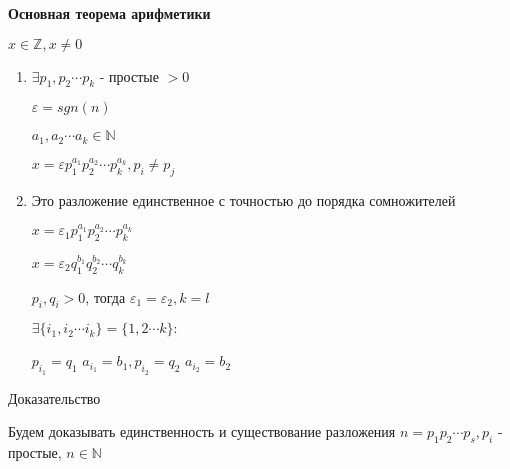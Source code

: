 \documentclass[14pt, letter paper]{article}
\begin{document}
\textbf{Основная теорема арифметики}

$x \in \mathds{Z}, x \neq 0$

\begin{enumerate}
    \item $\exists p_1, p_2 \cdots p_k$ - простые $> 0$

    $\varepsilon = sgn(n)$

    $a_1, a_2 \cdots a_k \in \mathds{N}$

    $x = \varepsilon p_1^{a_1} p_2^{a_2} \cdots p_k^{a_k}, p_i \neq p_j$

    \item Это разложение единственное с точностью до порядка сомножителей

    $x = \varepsilon_1 p_1^{a_1} p_2^{a_2} \cdots p_k^{a_k}$

    $x = \varepsilon_2 q_1^{b_1} q_2^{b_2} \cdots q_k^{b_k}$

    $p_i, q_i > 0$, тогда $\varepsilon_1 = \varepsilon_2, k = l$

    $\exists \{i_1, i_2 \cdots i_k\} = \{1, 2 \cdots k\}:$

    $p_{i_1} = q_1$ $a_{i_1} = b_1, p_{i_2} = q_2$ $a_{i_2} = b_2$
\end{enumerate}

\begin{center}
    Доказательство
\end{center}

Будем доказывать единственность и существование разложения $n = p_1 p_2 \cdots p_s, p_i$ - простые, $n \in \mathds{N}$
\end{document}
